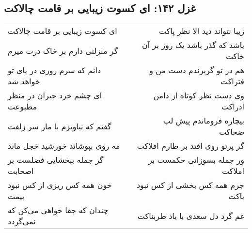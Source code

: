 \begin{center}
\section*{غزل ۱۴۲: ای کسوت زیبایی بر قامت چالاکت}
\label{sec:142}
\begin{longtable}{l p{0.5cm} r}
ای کسوت زیبایی بر قامت چالاکت
&&
زیبا نتواند دید الا نظر پاکت
\\
گر منزلتی دارم بر خاک درت میرم
&&
باشد که گذر باشد یک روز بر آن خاکت
\\
دانم که سرم روزی در پای تو خواهد شد
&&
هم در تو گریزندم دست من و فتراکت
\\
ای چشم خرد حیران در منظر مطبوعت
&&
وی دست نظر کوتاه از دامن ادراکت
\\
گفتم که نیاویزم با مار سر زلفت
&&
بیچاره فروماندم پیش لب ضحاکت
\\
مه روی بپوشاند خورشید خجل ماند
&&
گر پرتو روی افتد بر طارم افلاکت
\\
گر جمله ببخشایی فضلست بر اصحابت
&&
ور جمله بسوزانی حکمست بر املاکت
\\
خون همه کس ریزی از کس نبود بیمت
&&
جرم همه کس بخشی از کس نبود باکت
\\
چندان که جفا خواهی می‌کن که نمی‌گردد
&&
غم گرد دل سعدی با یاد طربناکت
\\
\end{longtable}
\end{center}
